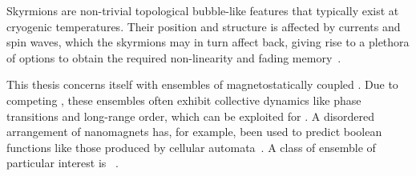 Skyrmions are non-trivial topological bubble-like features that typically exist at cryogenic temperatures.
Their position and structure is affected by currents and spin waves, which the skyrmions may in turn affect back, giving rise to a plethora of options to obtain the required non-linearity and fading memory~\cite{RC_TaskAgnosticMetrics_v2,RC_SkyrmionCrystalSW}. \par
This thesis concerns itself with ensembles of magnetostatically coupled .
Due to competing , these ensembles often exhibit collective dynamics like phase transitions and long-range order, which can be exploited for .
A disordered arrangement of nanomagnets has, for example, been used to predict boolean functions like those produced by cellular automata~\cite{RC_PassiveFrustratedNM,RC_DipoleNanomagnets}. %
A class of ensemble of particular interest is ~\cite{RC_ASI}.

